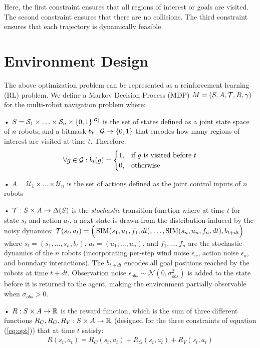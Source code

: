 \documentclass{article}
\begin{document}
Here, the first constraint ensures that all regions of interest or goals are visited. The second constraint ensures that there are no collisions. The third constraint ensures that each trajectory is dynamically feasible.

\section{Environment Design}
The above optimization problem can be represented as a reinforcement learning (RL) problem. We define a Markov Decision Process (MDP) $M = (S, A, \mathcal{T}, R, \gamma)$ for the multi-robot navigation problem where:

• $S = \mathcal{S}_1 \times \ldots \times \mathcal{S}_n \times \{0, 1 \}^{|\mathcal{G}|}$ is the set of states defined as a joint state space of $n$ robots, and a bitmask $b_t: \mathcal{G} \to \{0, 1\}$ that encodes how many regions of interest are visited at time $t$. Therefore: 
\begin{equation}
\forall g \in \mathcal{G}: b_t(g) =
\begin{cases}
    1, &\text{if $g$ is visited before $t$} \\
    0, &\text{otherwise}
\end{cases}
\end{equation}

• $A = \mathcal{U}_1 \times \ldots \times \mathcal{U}_n$ is the set of actions defined as the joint control inputs of $n$ robots

• $\mathcal{T}: S \times A \to \Delta(S)$ is the \emph{stochastic} transition function where at time $t$ for state $s_t$ and action $a_t$, a next state is drawn from the distribution induced by the noisy dynamics: $\mathcal{T}(s_t,a_t) = \Big( \operatorname{SIM}(s_1,u_1,f_1,dt), \ldots , \operatorname{SIM}(s_n,u_n,f_n,dt), b_{t+dt} \Big)$ where $s_t = (s_1,\ldots,s_n, b_t)$, $a_t = (u_1,\ldots,u_n)$, and $f_1,\ldots, f_n$ are the stochastic dynamics of the $n$ robots (incorporating per-step wind noise $\epsilon_w$, action noise $\epsilon_a$, and boundary interactions). The $b_{t+dt}$ encodes all goal positions reached by the robots at time $t+dt$. Observation noise $\epsilon_{obs} \sim \mathcal{N}(0, \sigma_{obs}^2)$ is added to the state before it is returned to the agent, making the environment partially observable when $\sigma_{obs} > 0$.

• $R: S \times A \to \mathbb{R}$ is the reward function, which is the sum of three different functions $R_C, R_G, R_V: S \times A \to \mathbb{R}$ (designed for the three constraints of equation (\ref{eq:opt})) that at time $t$ satisfy:
\begin{align}
\label{eq:reward}
    R(s_t,a_t) = R_C(s_t,a_t) + R_G(s_t,a_t) + R_V (s_t,a_t)
\end{align}
\end{document}
